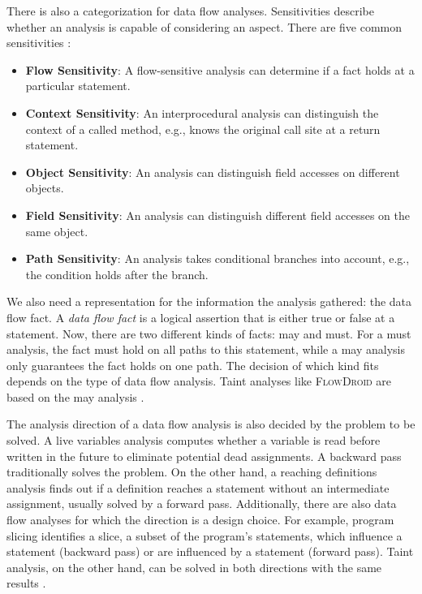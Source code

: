 \documentclass[../draft.tex]{subfiles}
\begin{document}
    There is also a categorization for data flow analyses.
    Sensitivities describe whether an analysis is capable of considering an aspect.
    There are five common sensitivities \cite{Khedker2009,Arzt2017PhD}:
    \begin{itemize}
        \item \textbf{Flow Sensitivity}: A flow-sensitive analysis can determine if a fact holds at a particular statement.
        \item \textbf{Context Sensitivity}: An interprocedural analysis can distinguish the context of a called method, e.g., knows the original call site at a return statement.
        \item \textbf{Object Sensitivity}: An analysis can distinguish field accesses on different objects.
        \item \textbf{Field Sensitivity}: An analysis can distinguish different field accesses on the same object.
        \item \textbf{Path Sensitivity}: An analysis takes conditional branches into account, e.g., the condition holds after the branch.
    \end{itemize}

    We also need a representation for the information the analysis gathered: the data flow fact.
    A \textit{data flow fact} is a logical assertion that is either true or false at a statement.
    Now, there are two different kinds of facts: may and must.
    For a must analysis, the fact must hold on all paths to this statement, while a may analysis only guarantees the fact holds on one path.
    The decision of which kind fits depends on the type of data flow analysis.
    Taint analyses like \textsc{FlowDroid} are based on the may analysis \cite{Arzt2017PhD}.

    The analysis direction of a data flow analysis is also decided by the problem to be solved.
    A live variables analysis computes whether a variable is read before written in the future to eliminate potential dead assignments.
    A backward pass traditionally solves the problem.
    On the other hand, a reaching definitions analysis finds out if a definition reaches a statement without an intermediate assignment, usually solved by a forward pass.
    Additionally, there are also data flow analyses for which the direction is a design choice.
    For example, program slicing identifies a slice, a subset of the program's statements, which influence a statement (backward pass) or are influenced by a statement (forward pass).
    Taint analysis, on the other hand, can be solved in both directions with the same results \cite{Khedker2009}.
\end{document}
